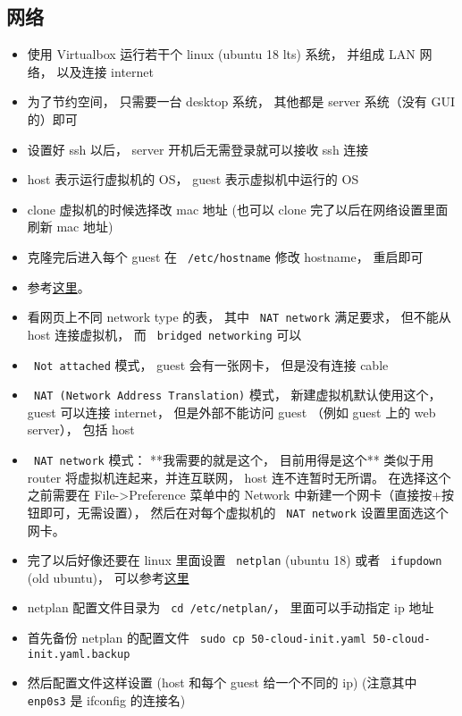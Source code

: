 \subsection{网络}

\begin{itemize}
\item 使用 Virtualbox 运行若干个 linux (ubuntu 18 lts) 系统， 并组成 LAN 网络， 以及连接 internet
\item 为了节约空间， 只需要一台 desktop 系统， 其他都是 server 系统（没有 GUI 的）即可
\item 设置好 ssh 以后， server 开机后无需登录就可以接收 ssh 连接
\item host 表示运行虚拟机的 OS， guest 表示虚拟机中运行的 OS
\item clone 虚拟机的时候选择改 mac 地址 (也可以 clone 完了以后在网络设置里面刷新 mac 地址)
\item 克隆完后进入每个 guest 在 \verb` /etc/hostname` 修改 hostname， 重启即可
\item 参考\href{https://www.thomas-krenn.com/en/wiki/Network_Configuration_in_VirtualBox}{这里}。
\item 看网页上不同 network type 的表， 其中 \verb` NAT network` 满足要求， 但不能从 host 连接虚拟机， 而 \verb` bridged networking` 可以
\item \verb` Not attached` 模式， guest 会有一张网卡， 但是没有连接 cable
\item \verb` NAT (Network Address Translation)` 模式， 新建虚拟机默认使用这个， guest 可以连接 internet， 但是外部不能访问 guest （例如 guest 上的 web server）， 包括 host
\item \verb` NAT network` 模式： **我需要的就是这个， 目前用得是这个** 类似于用 router 将虚拟机连起来，并连互联网， host 连不连暂时无所谓。 在选择这个之前需要在 File->Preference 菜单中的 Network 中新建一个网卡（直接按+按钮即可，无需设置）， 然后在对每个虚拟机的 \verb` NAT network` 设置里面选这个网卡。
\item 完了以后好像还要在 linux 里面设置 \verb` netplan` (ubuntu 18) 或者 \verb` ifupdown` (old ubuntu)， 可以参考\href{https://www.linux.com/tutorials/how-use-netplan-network-configuration-tool-linux/}{这里}
\item netplan 配置文件目录为 \verb` cd /etc/netplan/`， 里面可以手动指定 ip 地址
\item 首先备份 netplan 的配置文件 \verb` sudo cp 50-cloud-init.yaml 50-cloud-init.yaml.backup`
\item 然后配置文件这样设置 (host 和每个 guest 给一个不同的 ip) (注意其中 \verb` enp0s3` 是 ifconfig 的连接名)

\end{itemize}
